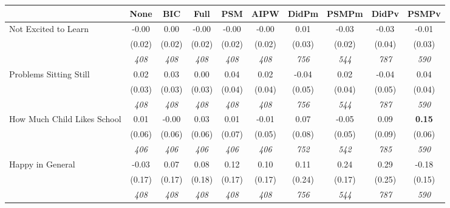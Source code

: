 \begin{tabular}{l c c c c c c c c c}
\toprule
 & None & BIC & Full & PSM & AIPW & DidPm & PSMPm & DidPv & PSMPv \\
\midrule
Not Excited to Learn & -0.00 & 0.00 & -0.00 & -0.00 & -0.00 & 0.01 & -0.03 & -0.03 & -0.01 \\
& (0.02) & (0.02) & (0.02) & (0.02) & (0.02) & (0.03) & (0.02) & (0.04) & (0.03) \\
& \textit{ 408 } & \textit{ 408 } & \textit{ 408 } & \textit{ 408 } & \textit{ 408 } & \textit{ 756 } & \textit{ 544 } & \textit{ 787 } & \textit{ 590 } \\
Problems Sitting Still & 0.02 & 0.03 & 0.00 & 0.04 & 0.02 & -0.04 & 0.02 & -0.04 & 0.04 \\
& (0.03) & (0.03) & (0.03) & (0.04) & (0.04) & (0.05) & (0.04) & (0.05) & (0.04) \\
& \textit{ 408 } & \textit{ 408 } & \textit{ 408 } & \textit{ 408 } & \textit{ 408 } & \textit{ 756 } & \textit{ 544 } & \textit{ 787 } & \textit{ 590 } \\
How Much Child Likes School & 0.01 & -0.00 & 0.03 & 0.01 & -0.01 & 0.07 & -0.05 & 0.09 & \textbf{0.15} \\
& (0.06) & (0.06) & (0.06) & (0.07) & (0.05) & (0.08) & (0.05) & (0.09) & (0.06) \\
& \textit{ 406 } & \textit{ 406 } & \textit{ 406 } & \textit{ 406 } & \textit{ 406 } & \textit{ 752 } & \textit{ 542 } & \textit{ 785 } & \textit{ 590 } \\
Happy in General & -0.03 & 0.07 & 0.08 & 0.12 & 0.10 & 0.11 & 0.24 & 0.29 & -0.18 \\
& (0.17) & (0.17) & (0.18) & (0.17) & (0.17) & (0.24) & (0.17) & (0.25) & (0.15) \\
& \textit{ 408 } & \textit{ 408 } & \textit{ 408 } & \textit{ 408 } & \textit{ 408 } & \textit{ 756 } & \textit{ 544 } & \textit{ 787 } & \textit{ 590 } \\
\bottomrule
\end{tabular}
